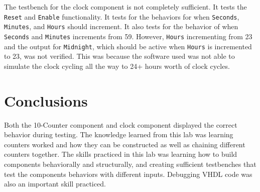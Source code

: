 \documentclass[11pt]{report}
\begin{document}
The testbench for the clock component is not completely sufficient. It tests the \verb|Reset| and
\verb|Enable| functionality. It tests for the behaviors for when \verb|Seconds|, \verb|Minutes|, and
\verb|Hours| should increment. It also tests for the behavior of when \verb|Seconds| and
\verb|Minutes| increments from 59. However, \verb|Hours| incrementing from 23 and the output for
\verb|Midnight|, which should be active when \verb|Hours| is incremented to 23, was not verified.
This was because the software used was not able to simulate the clock cycling all the way to 24+
hours worth of clock cycles.

\section*{Conclusions}
Both the 10-Counter component and clock component displayed the correct behavior during testing. The
knowledge learned from this lab was learning counters worked and how they can be constructed as well
as chaining different counters together. The skills practiced in this lab was learning how to build
components behaviorally and structurally, and creating sufficient testbenches that test the
components behaviors with different inputs. Debugging VHDL code was also an important skill
practiced.

% 
% 
% 
% 
% 
% 
\end{document}

